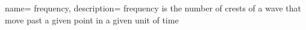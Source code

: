  {
    name= frequency,
    description= {frequency is the number of crests of a wave that move past a given point in a given unit of time}
}
